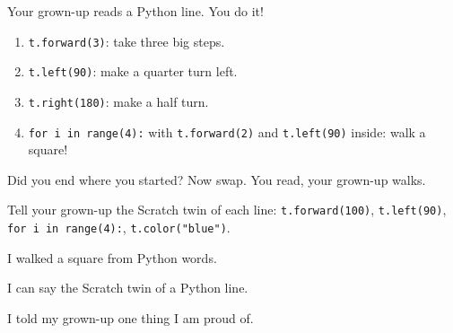 
\begin{playathome}
Your grown-up reads a Python line. You do it!
\begin{enumerate}[leftmargin=1.4em,itemsep=2pt]
  \item \texttt{t.forward(3)}: take three big steps.
  \item \texttt{t.left(90)}: make a quarter turn left.
  \item \texttt{t.right(180)}: make a half turn.
  \item \texttt{for i in range(4):} with \texttt{t.forward(2)} and \texttt{t.left(90)} inside: walk a square!
\end{enumerate}
Did you end where you started? Now swap. You read, your grown-up walks.
\end{playathome}

\begin{playathome}
Tell your grown-up the Scratch twin of each line: \texttt{t.forward(100)}, \texttt{t.left(90)}, \texttt{for i in range(4):}, \texttt{t.color("blue")}.
\end{playathome}

\begin{selfcheck}
  \item I walked a square from Python words.
  \item I can say the Scratch twin of a Python line.
  \item I told my grown-up one thing I am proud of.
\end{selfcheck}
